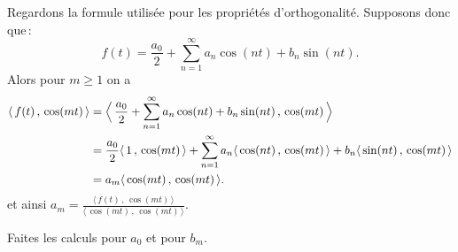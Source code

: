 Regardons la formule utilisée pour les propriétés d'orthogonalité. Supposons donc que\,:  
\begin{equation*}
f(t) = \frac{a_0}{2} + \sum_{n=1}^\infty a_n \cos (n t) + b_n
\sin (n t) .
\end{equation*}
Alors pour $m \geq 1$ on a
\begin{equation*}
\begin{split}
\langle \, f(t)\,,\,\cos (mt) \, \rangle
& =
\Bigl\langle \, \frac{a_0}{2} + \sum_{n=1}^\infty a_n \cos (n t) + b_n
\sin (n t) \,,\, \cos (mt) \, \Bigr\rangle \\
& =
\frac{a_0}{2}
\langle \, 1 \, , \, \cos (mt) \, \rangle
+ \sum_{n=1}^\infty
a_n \langle \, \cos (nt) \, , \, \cos (mt) \, \rangle +
b_n \langle \, \sin (n t) \, , \, \cos (mt) \, \rangle \\
& =
a_m \langle \, \cos (mt) \, , \, \cos (mt) \, \rangle .
\end{split}
\end{equation*}
et ainsi
$a_m =
\frac{\langle \, f(t) \, , \, \cos (mt) \, \rangle}{\langle \, \cos (mt) \, , \,
\cos (mt) \, \rangle}$.

\begin{exercise}
Faites les calculs pour $a_0$ et pour $b_m$.
\end{exercise}

